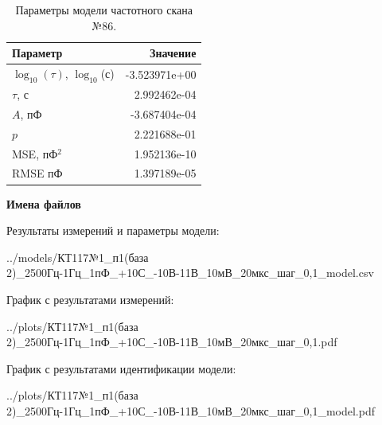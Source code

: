 \begin{table}[!ht]
    \centering
    \caption{Параметры модели частотного скана №86.}
    \begin{tabular}{|l|r|}
        \hline
        Параметр                                       & Значение                  \\ \hline
        $\log_{10}(\tau)$, $\log_{10}$(с)              & -3.523971e+00             \\ \hline
        $\tau$, с                                      & 2.992462e-04              \\ \hline
        $A$, пФ                                        & -3.687404e-04             \\ \hline
        $p$                                            & 2.221688e-01              \\ \hline
        MSE, пФ$^2$                                    & 1.952136e-10              \\ \hline
        RMSE пФ                                        & 1.397189e-05              \\ \hline
    \end{tabular}
    \label{table:frequency_scan_model_86}
\end{table}

\textbf{Имена файлов}

Результаты измерений и параметры модели:

\scriptsize../models/КТ117№1\_п1(база 2)\_2500Гц-1Гц\_1пФ\_+10С\_-10В-11В\_10мВ\_20мкс\_шаг\_0,1\_model.csv
\normalsize

График с результатами измерений:

\scriptsize../plots/КТ117№1\_п1(база 2)\_2500Гц-1Гц\_1пФ\_+10С\_-10В-11В\_10мВ\_20мкс\_шаг\_0,1.pdf
\normalsize

График с результатами идентификации модели:

\scriptsize../plots/КТ117№1\_п1(база 2)\_2500Гц-1Гц\_1пФ\_+10С\_-10В-11В\_10мВ\_20мкс\_шаг\_0,1\_model.pdf
\normalsize

